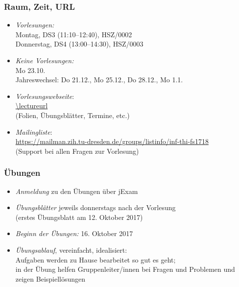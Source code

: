 \documentclass[onlymath]{beamer}
\begin{document}
\maketitle



% 
% 

\begin{frame}\frametitle{Raum, Zeit, URL}

\begin{itemize}
\item \emph{Vorlesungen:}\\
	Montag, DS3 (11:10--12:40), HSZ/0002\\
	Donnerstag, DS4 (13:00--14:30), HSZ/0003
\item \emph{Keine Vorlesungen:}\\
	Mo 23.10.\\
	Jahreswechsel: Do 21.12., Mo 25.12., Do 28.12., Mo 1.1.
\item \emph{Vorlesungswebseite}:\\[1ex]
	\url{\lectureurl}\\[1ex]
	(Folien, Übungsblätter, Termine, etc.)
\item \emph{Mailingliste}:\\[1ex]
	\url{https://mailman.zih.tu-dresden.de/groups/listinfo/inf-thi-fs1718}\\[1ex]
	(Support bei allen Fragen zur Vorlesung)
\end{itemize}

\end{frame}


\begin{frame}\frametitle{Übungen}
\begin{itemize}
\item \emph{Anmeldung} zu den Übungen über jExam
\item \emph{Übungsblätter} jeweils donnerstags nach der Vorlesung\\
	(erstes Übungsblatt am 12. Oktober 2017)
\item \emph{Beginn der Übungen:} 16. Oktober 2017
\item \emph{Übungsablauf}, vereinfacht, idealisiert:\\
	Aufgaben werden zu Hause bearbeitet so gut es geht;\\
	in der Übung helfen Gruppenleiter/innen bei Fragen und Problemen und zeigen Beispiellösungen\\[1ex]
\end{itemize}

\end{frame}
\end{document}
